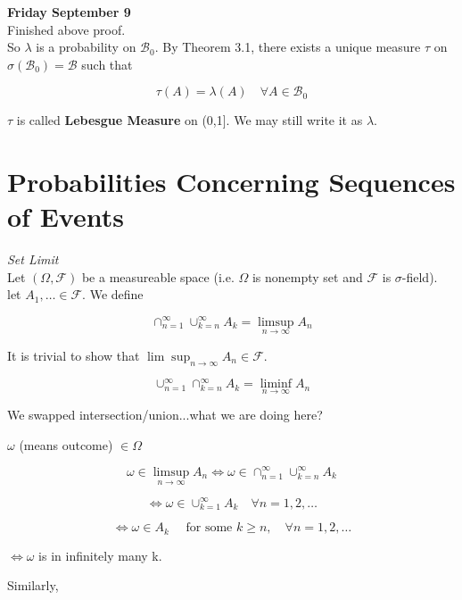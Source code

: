 \documentclass[11pt,fleqn]{book} %
\begin{document}
\textbf{Friday September 9}\\

Finished above proof. \\

So $\lambda$ is a probability on $\mathscr{B}_0$. By Theorem 3.1, there exists a unique measure $\tau$ on $\sigma(\mathscr{B}_0) = \mathscr{B}$ such that 

		$$\tau(A) = \lambda(A) \quad \forall A \in \mathscr{B}_0 $$

$\tau$ is called \textbf{Lebesgue Measure} on (0,1]. We may still write it as $\lambda$.






\section{Probabilities Concerning Sequences of Events}

\textit{Set Limit}\\

Let $(\Omega, \mathscr{F})$ be a measureable space (i.e. $\Omega$ is nonempty set and $\mathscr{F}$ is $\sigma$-field). \\

let $A_1, \dots \in \mathscr{F}$. We define 

$$\cap^\infty_{n=1} \cup^\infty_{k=n} A_k = \limsup_{n\rightarrow \infty} A_n $$

It is trivial to show that $\lim\sup_{n\rightarrow \infty} A_n \in \mathscr{F}$. 


$$ \cup^\infty_{n=1} \cap^\infty_{k=n} A_k = \liminf_{n\rightarrow \infty} A_n $$

We swapped intersection/union...what we are doing here?

$\omega$ (means outcome) $\in \Omega$

$$\omega \in \limsup_{n \rightarrow \infty} A_n \Leftrightarrow \omega \in \cap^\infty_{n=1} \cup^\infty_{k=n} A_k$$

$$\Leftrightarrow \omega \in \cup^\infty_{k=1} A_k \quad \forall n=1, 2, \dots $$

$$\Leftrightarrow \omega \in A_k \quad \text{ for some }k\geq n, \quad \forall n = 1, 2, \dots $$

$\Leftrightarrow \omega$ is in infinitely many k. 

Similarly, 
\end{document}
